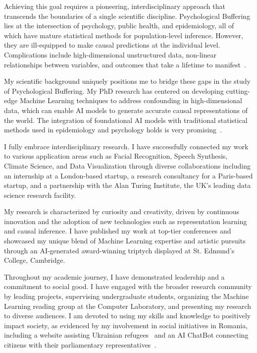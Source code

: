 \documentclass[a4paper]{article}
\begin{document}
Achieving this goal requires a pioneering, interdisciplinary approach that transcends the boundaries of a single scientific discipline. Psychological Buffering lies at the intersection of psychology, public health, and epidemiology, all of which have mature statistical methods for population-level inference. However, they are ill-equipped to make causal predictions at the individual level. Complications include high-dimensional unstructured data, non-linear relationships between variables, and outcomes that take a lifetime to manifest~\autocite{sharma_clinical_2021}.

My scientific background uniquely positions me to bridge these gaps in the study of Psychological Buffering. My PhD research has centered on developing cutting-edge Machine Learning techniques to address confounding in high-dimensional data, which can enable AI models to generate accurate causal representations of the world. The integration of foundational AI models with traditional statistical methods used in epidemiology and psychology holds is very promising~\autocite{lauritsen_framing_2021}.

I fully embrace interdisciplinary research. I have successfully connected my work to various application areas such as Facial Recognition, Speech Synthesis, Climate Science, and Data Visualization through diverse collaborations including an internship at a London-based startup, a research consultancy for a Paris-based startup, and a partnership with the Alan Turing Institute, the UK's leading data science research facility.

My research is characterized by curiosity and creativity, driven by continuous innovation and the adoption of new technologies such as representation learning and causal inference. I have published my work at top-tier conferences and showcased my unique blend of Machine Learning expertise and artistic pursuits through an AI-generated award-winning triptych displayed at St. Edmund's College, Cambridge.

Throughout my academic journey, I have demonstrated leadership and a commitment to social good. I have engaged with the broader research community by leading projects, supervising undergraduate students, organizing the Machine Learning reading group at the Computer Laboratory, and presenting my research to diverse audiences. I am devoted to using my skills and knowledge to positively impact society, as evidenced by my involvement in social initiatives in Romania, including a website assisting Ukrainian refugees~\autocite{dopomoha} and an AI ChatBot connecting citizens with their parliamentary representatives~\autocite{ion}.
\end{document}
